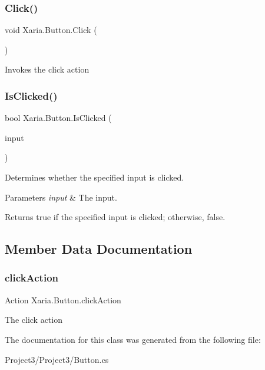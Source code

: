 \subsubsection{\texorpdfstring{Click()}{Click()}}
{\footnotesize\ttfamily void Xaria.\+Button.\+Click (\begin{DoxyParamCaption}{ }\end{DoxyParamCaption})\hspace{0.3cm}{\ttfamily [inline]}}



Invokes the click action 

\mbox{\label{classXaria_1_1Button_aa60b3edf6886916fb025d60db4645ade}} 
\subsubsection{\texorpdfstring{Is\+Clicked()}{IsClicked()}}
{\footnotesize\ttfamily bool Xaria.\+Button.\+Is\+Clicked (\begin{DoxyParamCaption}\item[{Touch\+Location}]{input }\end{DoxyParamCaption})\hspace{0.3cm}{\ttfamily [inline]}}



Determines whether the specified input is clicked. 


\begin{DoxyParams}{Parameters}
{\em input} & The input.\\
\hline
\end{DoxyParams}
\begin{DoxyReturn}{Returns}
{\ttfamily true} if the specified input is clicked; otherwise, {\ttfamily false}. 
\end{DoxyReturn}


\subsection{Member Data Documentation}
\mbox{\label{classXaria_1_1Button_adbeeb3818c76acb80a43342fc24f1f0f}} 
\subsubsection{\texorpdfstring{click\+Action}{clickAction}}
{\footnotesize\ttfamily Action Xaria.\+Button.\+click\+Action\hspace{0.3cm}{\ttfamily [private]}}



The click action 



The documentation for this class was generated from the following file\+:\begin{DoxyCompactItemize}
\item 
Project3/\+Project3/Button.\+cs\end{DoxyCompactItemize}
